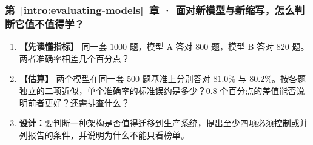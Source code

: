 \subsubsection*{第~\ref*{intro:evaluating-models}~章 · 面对新模型与新缩写，怎么判断它值不值得学？}
\begin{enumerate}[label={},leftmargin=4.8em,itemsep=4pt]
\item[\textbf{C-122.}] \leavevmode{}\label{exercise:C-122}\label{exercise:metric-percentage-points}\textbf{【先读懂指标】} 同一套 $1000$ 题，模型 A 答对 $800$ 题，模型 B 答对 $820$ 题。两者准确率相差几个百分点？
\item[\textbf{C-123.}] \leavevmode{}\label{exercise:C-123}\label{exercise:benchmark-count-gap}\textbf{【估算】} 两个模型在同一套 $500$ 题基准上分别答对 $81.0\%$ 与 $80.2\%$。按各题独立的二项近似，单个准确率的标准误约是多少？$0.8$ 个百分点的差值能否说明前者更好？还需排查什么？
\item[\textbf{C-124.}] \leavevmode{}\label{exercise:C-124}\label{exercise:production-architecture-evaluation}\textbf{设计：}要判断一种架构是否值得迁移到生产系统，提出至少四项必须控制或并列报告的条件，并说明为什么不能只看榜单。
\end{enumerate}
